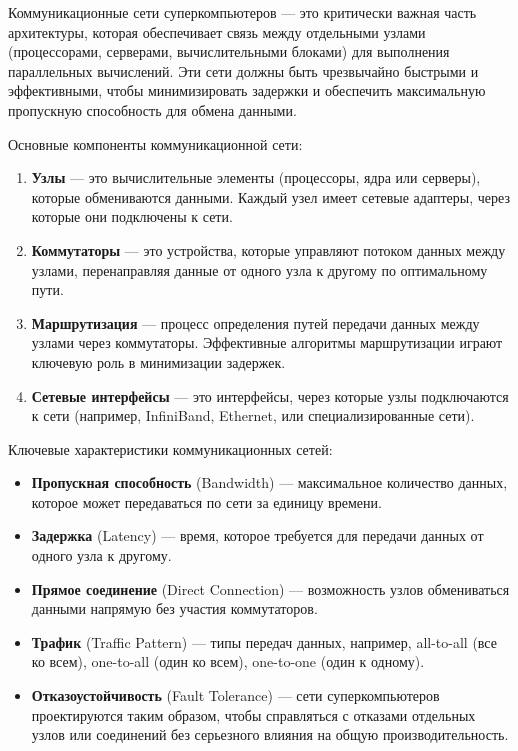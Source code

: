 \documentclass[11pt,a4paper,final]{article} %
\begin{document}
\par Коммуникационные сети суперкомпьютеров — это критически важная часть архитектуры, которая обеспечивает связь между отдельными узлами (процессорами, серверами, вычислительными блоками) для выполнения параллельных вычислений. Эти сети должны быть чрезвычайно быстрыми и эффективными, чтобы минимизировать задержки и обеспечить максимальную пропускную способность для обмена данными.

\par Основные компоненты коммуникационной сети:

\begin{enumerate}
	\item \textbf{Узлы} — это вычислительные элементы (процессоры, ядра или серверы), которые обмениваются данными. Каждый узел имеет сетевые адаптеры, через которые они подключены к сети.
	\item \textbf{Коммутаторы} — это устройства, которые управляют потоком данных между узлами, перенаправляя данные от одного узла к другому по оптимальному пути.
	\item \textbf{Маршрутизация} — процесс определения путей передачи данных между узлами через коммутаторы. Эффективные алгоритмы маршрутизации играют ключевую роль в минимизации задержек.
	\item \textbf{Сетевые интерфейсы} — это интерфейсы, через которые узлы подключаются к сети (например, InfiniBand, Ethernet, или специализированные сети).
\end{enumerate}

\par Ключевые характеристики коммуникационных сетей:

\begin{itemize}
	\item \textbf{Пропускная способность} (Bandwidth) — максимальное количество данных, которое может передаваться по сети за единицу времени.
	\item \textbf{Задержка} (Latency) — время, которое требуется для передачи данных от одного узла к другому.
	\item \textbf{Прямое соединение} (Direct Connection) — возможность узлов обмениваться данными напрямую без участия коммутаторов.
	\item \textbf{Трафик} (Traffic Pattern) — типы передач данных, например, all-to-all (все ко всем), one-to-all (один ко всем), one-to-one (один к одному).
	\item \textbf{Отказоустойчивость} (Fault Tolerance) — сети суперкомпьютеров проектируются таким образом, чтобы справляться с отказами отдельных узлов или соединений без серьезного влияния на общую производительность.
\end{itemize}
\end{document}
